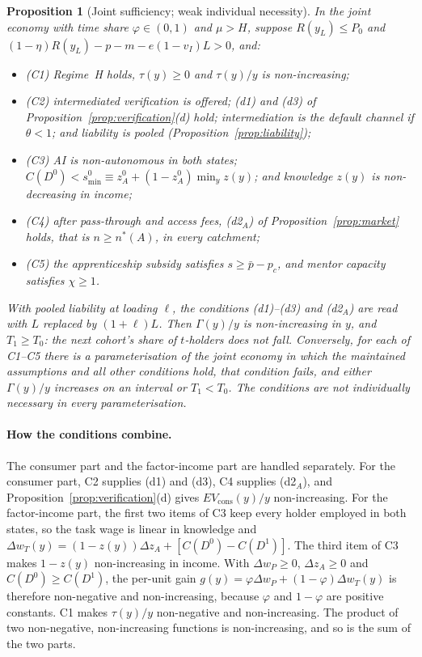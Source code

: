 \documentclass[12pt]{article}
\newtheorem{proposition}{Proposition}
\theoremstyle{remark}
\begin{document}
\begin{proposition}[Joint sufficiency; weak individual necessity]\label{prop:synthesis}
In the joint economy with time share $\varphi\in(0,1)$ and $\mu>H$, suppose $R(y_L)\le P_0$ and $(1-\eta)R(y_L)-p-m-e(1-v_I)L>0$, and:
\begin{itemize}[itemsep=0pt]
\item[] (C1) Regime~H holds, $\tau(y)\ge0$ and $\tau(y)/y$ is non-increasing;
\item[] (C2) intermediated verification is offered; (d1) and (d3) of Proposition~\ref{prop:verification}(d) hold; intermediation is the default channel if $\theta<1$; and liability is pooled (Proposition~\ref{prop:liability});
\item[] (C3) AI is non-autonomous in both states; $C(D^0)<s^0_{\min}\equiv z_A^0+(1-z_A^0)\min_y z(y)$; and knowledge $z(y)$ is non-decreasing in income;
\item[] (C4) after pass-through and access fees, (d2$_A$) of Proposition~\ref{prop:market} holds, that is $n\ge n^*(A)$, in every catchment;
\item[] (C5) the apprenticeship subsidy satisfies $s\ge\bar p-p_c$, and mentor capacity satisfies $\chi\ge1$.
\end{itemize}
With pooled liability at loading $\ell$, the conditions (d1)--(d3) and (d2$_A$) are read with $L$ replaced by $(1+\ell)L$.
Then $\Gamma(y)/y$ is non-increasing in $y$, and $T_1\ge T_0$: the next cohort's share of $t$-holders does not fall. Conversely, for each of C1--C5 there is a parameterisation of the joint economy in which the maintained assumptions and all other conditions hold, that condition fails, and either $\Gamma(y)/y$ increases on an interval or $T_1<T_0$. The conditions are not individually necessary in every parameterisation.
\end{proposition}

\paragraph{How the conditions combine.} The consumer part and the factor-income part are handled separately. For the consumer part, C2 supplies (d1) and (d3), C4 supplies (d2$_A$), and Proposition~\ref{prop:verification}(d) gives $EV_{\text{cons}}(y)/y$ non-increasing. For the factor-income part, the first two items of C3 keep every holder employed in both states, so the task wage is linear in knowledge and $\Delta w_T(y)=(1-z(y))\Delta z_A+[C(D^0)-C(D^1)]$. The third item of C3 makes $1-z(y)$ non-increasing in income. With $\Delta w_P\ge0$, $\Delta z_A\ge0$ and $C(D^0)\ge C(D^1)$, the per-unit gain $g(y)=\varphi\Delta w_P+(1-\varphi)\Delta w_T(y)$ is therefore non-negative and non-increasing, because $\varphi$ and $1-\varphi$ are positive constants. C1 makes $\tau(y)/y$ non-negative and non-increasing. The product of two non-negative, non-increasing functions is non-increasing, and so is the sum of the two parts.
\end{document}
